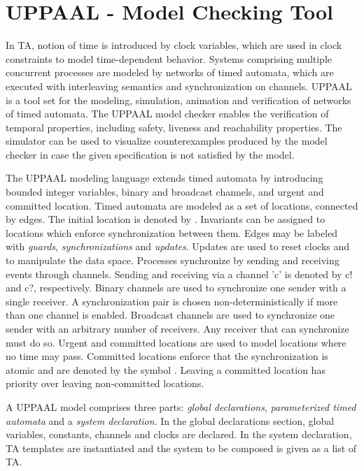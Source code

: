 \documentclass[letterpaper]{article}
\begin{document}
\section{UPPAAL - Model Checking Tool}
\label{4}
In TA, notion of time is introduced by clock variables, which are used in clock constraints to model time-dependent behavior. Systems comprising multiple concurrent processes are modeled by networks of timed automata, which are executed with interleaving semantics and synchronization on channels. UPPAAL  is a tool set for the modeling, simulation, animation and verification of networks of timed automata. The UPPAAL model checker enables the verification of temporal properties, including safety, liveness and reachability properties. The simulator can be used to visualize counterexamples produced by the model checker in case the given specification is not satisfied by the model.
\par The UPPAAL modeling language extends timed automata by introducing bounded integer variables, binary and broadcast channels, and urgent and committed location. Timed automata are modeled as a set of locations, connected by edges. The initial location is denoted by . Invariants can be assigned to locations which enforce synchronization between them. Edges may be labeled with \textit{guards}, \textit{synchronizations} and \textit{updates}. Updates are used to reset clocks and to manipulate the data space. Processes synchronize by sending and receiving events through channels. Sending and receiving via a channel 'c' is denoted by c! and c?, respectively. Binary channels are used to synchronize one sender with a single receiver. A synchronization pair is chosen non-deterministically if more than one channel is enabled. Broadcast channels are used to synchronize one sender with an arbitrary number of receivers. Any receiver that can synchronize must do so. Urgent and committed locations are used to model locations where no time may pass. Committed locations enforce that the synchronization is atomic and are denoted by the symbol . Leaving a committed location has priority over leaving non-committed locations.
\par A UPPAAL model comprises three parts: \textit{global declarations}, \textit{parameterized timed automata} and a \textit{system declaration}. In the global declarations section, global variables, constants, channels and clocks are declared. In the system declaration, TA templates are instantiated and the system to be composed is given as a list of TA.
\end{document}

